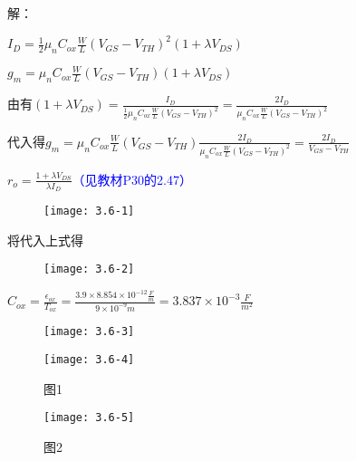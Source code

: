 






解：

$I_D=\frac{1}{2}\mu_nC_{ox}\frac{W}{L}(V_{GS}-V_{TH})^2(1+\lambda V_{DS})$

$g_m=\mu_nC_{ox}\frac{W}{L}(V_{GS}-V_{TH})(1+\lambda V_{DS})$

由有$(1+\lambda V_{DS})=\frac{I_D}{\frac{1}{2}\mu_nC_{ox}\frac{W}{L}(V_{GS}-V_{TH})^2}=\frac{2I_D}{\mu_nC_{ox}\frac{W}{L}(V_{GS}-V_{TH})^2}$

代入得$g_m=\mu_nC_{ox}\frac{W}{L}(V_{GS}-V_{TH})\frac{2I_D}{\mu_nC_{ox}\frac{W}{L}(V_{GS}-V_{TH})^2}=\frac{2I_D}{V_{GS}-V_{TH}}$

$r_o=\frac{1+\lambda V_{DS}}{\lambda I_D}$\textcolor{blue}{（见教材P30的2.47）}

\begin{figure}[H] %
	\begin{minipage}{\linewidth}
		\texttt{[image: 3.6-1]}
	\end{minipage}
\end{figure}

将代入上式得

\begin{figure}[H] %
	\begin{minipage}{\linewidth}
		\texttt{[image: 3.6-2]}
	\end{minipage}
\end{figure}

$C_{ox}=\frac{\epsilon_{ox}}{T_{ox}}=\frac{3.9 \times 8.854 \times 10^{-12}\frac{F}{m}}{9 \times 10^{-9}m}=3.837 \times 10^{-3}\frac{F}{m^2}$

\begin{figure}[H] %
	\begin{minipage}{\linewidth}
		\texttt{[image: 3.6-3]}
	\end{minipage}
\end{figure}

\scalebox{3}{（a）}

		\begin{figure}[H] %
	\begin{minipage}{\linewidth}
		\texttt{[image: 3.6-4]}
	\end{minipage}
	\caption*{图1} %
\end{figure}

\scalebox{3}{（b）}

		\begin{figure}[H] %
	\begin{minipage}{\linewidth}
		\texttt{[image: 3.6-5]}
	\end{minipage}
	\caption*{图2} %
\end{figure}







